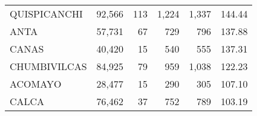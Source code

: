 \begin{tabular}{lrrrrr}
	\cellcolor[HTML]{FFFFC7}QUISPICANCHI                                               & 92,566                                                         & 113                                                      & 1,224                                                    & 1,337                                                               & 144.44                                                                       \\
	\cellcolor[HTML]{FFFFC7}ANTA                                                       & 57,731                                                         & 67                                                       & 729                                                      & 796                                                                 & 137.88                                                                       \\
	\cellcolor[HTML]{FFFFC7}CANAS                                                      & 40,420                                                         & 15                                                       & 540                                                      & 555                                                                 & 137.31                                                                       \\
	\cellcolor[HTML]{9AFF99}CHUMBIVILCAS                                               & 84,925                                                         & 79                                                       & 959                                                      & 1,038                                                               & 122.23                                                                       \\
	\cellcolor[HTML]{9AFF99}ACOMAYO                                                    & 28,477                                                         & 15                                                       & 290                                                      & 305                                                                 & 107.10                                                                       \\
	\cellcolor[HTML]{9AFF99}CALCA                                                      & 76,462                                                         & 37                                                       & 752                                                      & 789                                                                 & 103.19                                                                       \\

\end{tabular}
